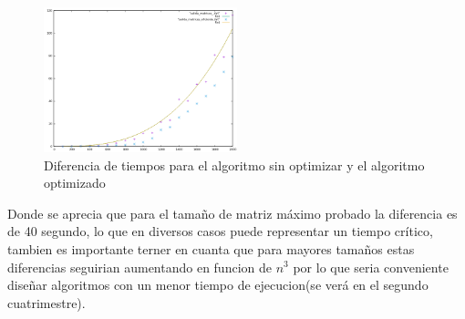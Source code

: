 \begin{figure}[H]
  \centering
  \includegraphics[width=0.5\textwidth]{./Imagenes/mult_matrices_optimizada_vs.png}
  \caption{Diferencia de tiempos para el algoritmo sin optimizar y el algoritmo optimizado}
\end{figure}

Donde se aprecia que para el tamaño de matriz máximo probado la diferencia es de 40 segundo, lo que en diversos casos puede representar un tiempo crítico, tambien es importante terner en cuanta que para mayores tamaños estas diferencias seguirian aumentando en funcion de $n^{3}$ por lo que seria conveniente diseñar algoritmos con un menor tiempo de ejecucion(se verá en el segundo cuatrimestre).